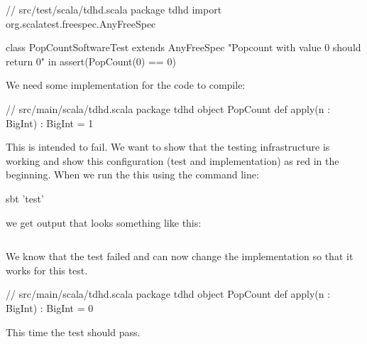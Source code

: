\documentclass{tufte-book}
\begin{document}
\begin{scalacode}
// src/test/scala/tdhd.scala
package tdhd
import org.scalatest.freespec.AnyFreeSpec

class PopCountSoftwareTest extends AnyFreeSpec {
  "Popcount with value 0 should return 0" in {
    assert(PopCount(0) == 0)
  }
}
\end{scalacode}
\vspace{-6\baselineskip}
\vspace{6\baselineskip}

We need some implementation for the code to compile:
\vspace{3\baselineskip}%
\vspace{-3\baselineskip}%
\begin{scalacode}
// src/main/scala/tdhd.scala
package tdhd
object PopCount {
  def apply(n : BigInt) : BigInt = {
    1
  }
}
\end{scalacode}
This is intended to fail. We want to show that the testing infrastructure is working and show this configuration (test and implementation) as red in the beginning. When we run the this using the command line:
\begin{bashcode}
sbt 'test'
\end{bashcode}
we get output that looks something like this:

\vspace{8\baselineskip}
\vspace{-8\baselineskip}
\inputminted[style=ansi,fontsize=\scriptsize,linenos,bgcolor=LightGray,frame=lines,framesep=2mm,baselinestretch=1.2]{ansi-terminal}{../chisel/fail.ansi-txt}

We know that the test failed and can now change the implementation so that it works for this test.
\begin{scalacode}
// src/main/scala/tdhd.scala
package tdhd
object PopCount {
  def apply(n : BigInt) : BigInt = {
    0
  }
}
\end{scalacode}
This time the test should pass.
\end{document}
